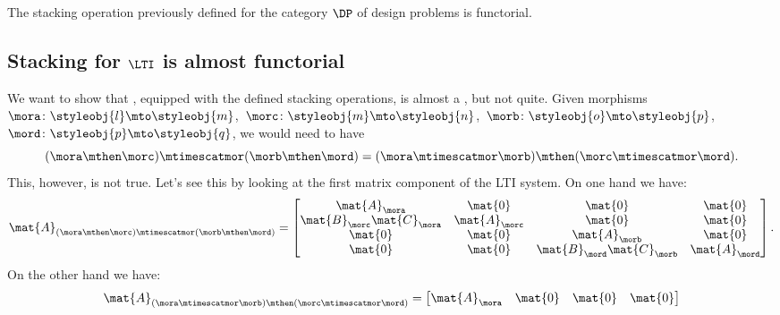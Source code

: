 \begin{example}
    The stacking operation previously defined for the category $\DP$ of design problems is functorial.
\end{example}

\subsection{Stacking for $\LTI$ is almost functorial}

\begin{example}
    We want to show that \LTI, equipped with the defined stacking operations, is almost a , but not quite.
    Given morphisms~$\mora\colon \styleobj{l}\mto \styleobj{m}$,~$\morc\colon \styleobj{m}\mto \styleobj{n}$,~$\morb\colon \styleobj{o}\mto \styleobj{p}$,~$\mord\colon \styleobj{p}\mto \styleobj{q}$, we would need to have
    \begin{equation*}
        (\mora \mthen \morc)
        \mtimescatmor (\morb\mthen \mord)=(\mora\mtimescatmor \morb)\mthen (\morc\mtimescatmor \mord).
    \end{equation*}
    This, however, is not true.
    Let's see this by looking at the first matrix component of the LTI system.
    On one hand we have:
    \begin{equation}\label{eq:checking-LTI-functorial-stacking-1}
        \mat{A}_{(\mora \mthen \morc)\mtimescatmor (\morb\mthen \mord)}=
        \begin{bmatrix}
            \mat{A}_\mora              & \mat{0}       & \mat{0}                    & \mat{0}       \\
            \mat{B}_\morc\mat{C}_\mora & \mat{A}_\morc & \mat{0}                    & \mat{0}       \\
            \mat{0}                    & \mat{0}       & \mat{A}_\morb              & \mat{0}       \\
            \mat{0}                    & \mat{0}       & \mat{B}_\mord\mat{C}_\morb & \mat{A}_\mord
        \end{bmatrix}.
    \end{equation}
    On the other hand we have:
    \begin{equation}\label{eq:checking-LTI-functorial-stacking-2}
        \mat{A}_{(\mora\mtimescatmor \morb)\mthen (\morc\mtimescatmor \mord)}=
        \begin{bmatrix}
            \mat{A}_\mora               & \mat{0}                     & \mat{0}       & \mat{0}       \\

\end{bmatrix}
\end{equation}
\end{example}
